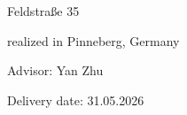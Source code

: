 \vspace*{-6mm}

\begin{large} 
\begin{center}
Feldstraße 35
\end{center}
\end{large} 

\vspace*{-6mm}

\begin{large} 
\begin{center}
realized in Pinneberg, Germany
\end{center}
\end{large} 

\vspace*{5mm}

\begin{large} 
\begin{center}
Advisor: Yan Zhu
\end{center}
\end{large} 

\vspace*{-6mm}

\begin{large} 
\begin{center}
Delivery date: 31.05.2026
\end{center}
\end{large} 


\pagestyle{empty} %


